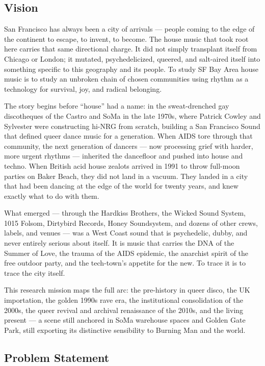 \documentclass[11pt,letterpaper]{article}
\begin{document}
\subsection{Vision}

San Francisco has always been a city of arrivals --- people coming to the edge of the continent to escape, to invent, to become. The house music that took root here carries that same directional charge. It did not simply transplant itself from Chicago or London; it mutated, psychedelicized, queered, and salt-aired itself into something specific to this geography and its people. To study SF Bay Area house music is to study an unbroken chain of chosen communities using rhythm as a technology for survival, joy, and radical belonging.

The story begins before ``house'' had a name: in the sweat-drenched gay discotheques of the Castro and SoMa in the late 1970s, where Patrick Cowley and Sylvester were constructing hi-NRG from scratch, building a San Francisco Sound that defined queer dance music for a generation. When AIDS tore through that community, the next generation of dancers --- now processing grief with harder, more urgent rhythms --- inherited the dancefloor and pushed into house and techno. When British acid house zealots arrived in 1991 to throw full-moon parties on Baker Beach, they did not land in a vacuum. They landed in a city that had been dancing at the edge of the world for twenty years, and knew exactly what to do with them.

What emerged --- through the Hardkiss Brothers, the Wicked Sound System, 1015 Folsom, Dirtybird Records, Honey Soundsystem, and dozens of other crews, labels, and venues --- was a West Coast sound that is psychedelic, dubby, and never entirely serious about itself. It is music that carries the DNA of the Summer of Love, the trauma of the AIDS epidemic, the anarchist spirit of the free outdoor party, and the tech-town's appetite for the new. To trace it is to trace the city itself.

This research mission maps the full arc: the pre-history in queer disco, the UK importation, the golden 1990s rave era, the institutional consolidation of the 2000s, the queer revival and archival renaissance of the 2010s, and the living present --- a scene still anchored in SoMa warehouse spaces and Golden Gate Park, still exporting its distinctive sensibility to Burning Man and the world.

\subsection{Problem Statement}
\end{document}
